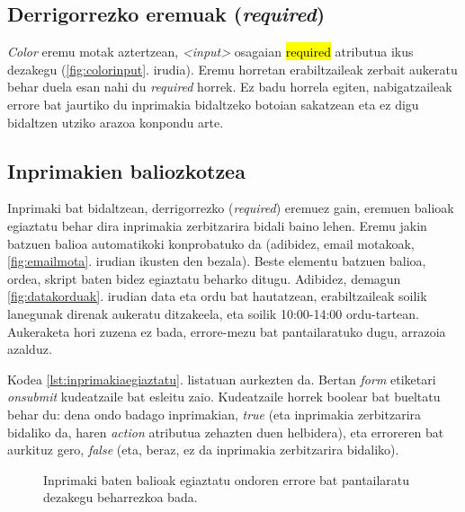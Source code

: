 \subsection{Derrigorrezko eremuak (\textit{required})}

\textit{Color} eremu motak aztertzean, \textit{<input>} osagaian \hl{required} atributua ikus dezakegu (\ref{fig:colorinput}. irudia). Eremu horretan erabiltzaileak zerbait aukeratu behar duela esan nahi du \textit{required} horrek. Ez badu horrela egiten, nabigatzaileak errore bat jaurtiko du inprimakia bidaltzeko botoian sakatzean eta ez digu bidaltzen utziko arazoa konpondu arte.

\subsection{Inprimakien baliozkotzea}

Inprimaki bat bidaltzean, derrigorrezko (\textit{required}) eremuez gain, eremuen balioak egiaztatu behar dira inprimakia zerbitzarira bidali baino lehen. Eremu jakin batzuen balioa automatikoki konprobatuko da (adibidez, email motakoak, \ref{fig:emailmota}. irudian ikusten den bezala). Beste elementu batzuen balioa, ordea, skript baten bidez egiaztatu beharko ditugu. Adibidez, demagun \ref{fig:datakorduak}. irudian data eta ordu bat hautatzean, erabiltzaileak soilik lanegunak direnak aukeratu ditzakeela, eta soilik 10:00-14:00 ordu-tartean. Aukeraketa hori zuzena ez bada, errore-mezu bat pantailaratuko dugu, arrazoia azalduz.

Kodea \ref{lst:inprimakiaegiaztatu}. listatuan aurkezten da. Bertan \textit{form} etiketari \textit{onsubmit} kudeatzaile bat esleitu zaio. Kudeatzaile horrek boolear bat bueltatu behar du: dena ondo badago inprimakian,  \textit{true} (eta inprimakia zerbitzarira bidaliko da, haren \textit{action} atributua zehazten duen helbidera), eta erroreren bat aurkituz gero, \textit{false} (eta, beraz, ez da inprimakia zerbitzarira bidaliko).

\begin{figure}[ht]
	\centering
{}
\caption{Inprimaki baten balioak egiaztatu ondoren errore bat pantailaratu dezakegu beharrezkoa bada.}
\label{fig:searchinput}
\end{figure}

